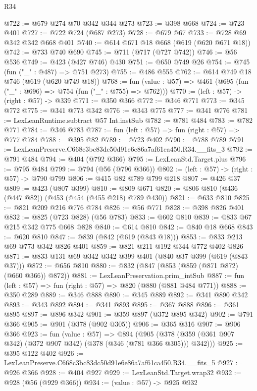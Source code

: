 \begin{lexlean}{R34}
\begin{coremodule}
@722 := @679 @274 @70 @342 @344 @273
@723 := @398 @668
@724 := @723 @401
@727 := @722 @724 (@687 @273)
@728 := @679 @67
@733 := @728 @69 @342 @342 @668 @401
@740 := @614 @671 @18 @668 (@619 (@620 @671 @18))
@742 := @733 @740 @690
@745 := @711 (@717 (@727 @742))
@746 := @56 @536
@749 := @423 (@427 @746) @430
@751 := @650 @749 @26
@754 := @745 (fun ("_" : @487) => @751 @273)
@755 := @486 @555
@762 := @614 @749 @18 @746 (@619 (@620 @749 @18))
@768 := fun (value : @57) => @461 (@695 (fun ("_" : @696) => @754 (fun ("_" : @755) => @762)))
@770 := (left : @57) -> (right : @57) -> @339
@771 := @350 @366
@772 := @346 @771
@773 := @345 @772
@775 := @341 @773 @342
@776 := @343 @775
@777 := @341 @776
@781 := LexLeanRuntime.subtract @57 Int.instSub
@782 := @781 @484
@783 := @782 @771
@784 := @346 @783
@787 := fun (left : @57) => fun (right : @57) => @777 @784
@788 := @395 @82
@789 := @723 @402
@790 := @788 @789
@791 := LexLeanPreserve.C668c3bc83dc50d91e6e86a7af61ca450.R34.__fits_3
@792 := @791 @484
@794 := @404 (@792 @366)
@795 := LexLeanStd.Target.plus
@796 := @795 @484
@799 := @794 (@56 (@796 @366))
@802 := (left : @57) -> (right : @57) -> @790 @799
@806 := @415 @82 @789 @799 @218
@807 := @426 @37
@809 := @423 (@807 @399)
@810 := @809 @671
@820 := @806 @810 (@436 (@447 @82)) (@453 (@454 (@455 @218) @789 @430))
@821 := @633 @810
@825 := @821 @209 @216 @776 @784
@826 := @56 @771
@828 := @398 @826 @401
@832 := @825 (@723 @828) (@56 @783)
@833 := @602 @810
@839 := @833 @67 @215 @342 @775 @668 @828
@840 := @614 @810
@842 := @840 @18 @668
@843 := @620 @810
@847 := @839 (@842 (@619 (@843 @18)))
@853 := @833 @213 @69 @773 @342 @826 @401
@859 := @821 @211 @192 @344 @772 @402 @826
@871 := @833 @131 @69 @342 @342 @399 @401 (@840 @37 @399 (@619 (@843 @37)))
@872 := @656 @810
@880 := @832 (@847 (@853 (@859 (@871 @872) (@660 @366)) @872))
@881 := LexLeanPreservation.prim_intSub
@887 := fun (left : @57) => fun (right : @57) => @820 (@880 (@881 @484 @771))
@888 := @350 @289
@889 := @346 @888
@890 := @345 @889
@892 := @341 @890 @342
@893 := @343 @892
@894 := @341 @893
@895 := @367 @888
@896 := @361 @895
@897 := @896 @342
@901 := @359 @897 (@372 @895 @342)
@902 := @791 @366
@905 := @901 (@378 (@902 @305))
@906 := @365 @316
@907 := @906 @366
@923 := fun (value : @57) =>
  @894 (@905 (@378 (@359 (@361 @907 @342) (@372 @907 @342) (@378 (@346 (@781 @366 @305))) @342)))
@925 := @395 @122 @402
@926 := LexLeanPreserve.C668c3bc83dc50d91e6e86a7af61ca450.R34.__fits_5
@927 := @926 @366
@928 := @404 @927
@929 := LexLeanStd.Target.wrap32
@932 := @928 (@56 (@929 @366))
@934 := (value : @57) -> @925 @932

\end{coremodule}
\end{lexlean}

